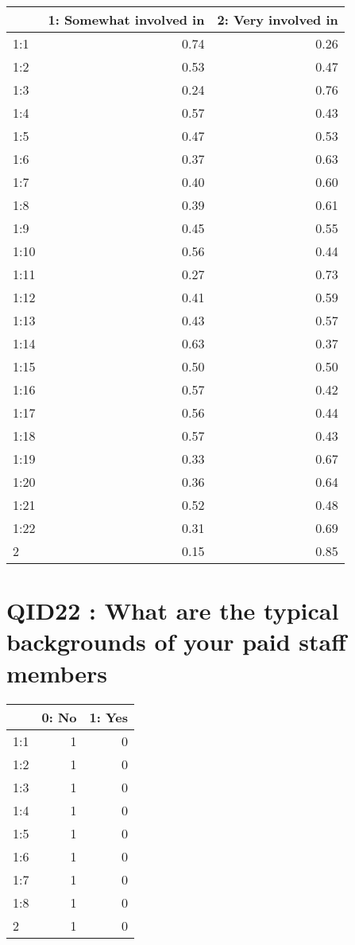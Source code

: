 \documentclass[]{article}
\begin{document}
\begin{table}[H]
\centering\begingroup\fontsize{30}{32}\selectfont

\begin{tabular}{l|r|r}
\hline
  & 1: Somewhat involved in &  2: Very involved in\\
\hline
1:1 & 0.74 & 0.26\\
\hline
1:2 & 0.53 & 0.47\\
\hline
1:3 & 0.24 & 0.76\\
\hline
1:4 & 0.57 & 0.43\\
\hline
1:5 & 0.47 & 0.53\\
\hline
1:6 & 0.37 & 0.63\\
\hline
1:7 & 0.40 & 0.60\\
\hline
1:8 & 0.39 & 0.61\\
\hline
1:9 & 0.45 & 0.55\\
\hline
1:10 & 0.56 & 0.44\\
\hline
1:11 & 0.27 & 0.73\\
\hline
1:12 & 0.41 & 0.59\\
\hline
1:13 & 0.43 & 0.57\\
\hline
1:14 & 0.63 & 0.37\\
\hline
1:15 & 0.50 & 0.50\\
\hline
1:16 & 0.57 & 0.42\\
\hline
1:17 & 0.56 & 0.44\\
\hline
1:18 & 0.57 & 0.43\\
\hline
1:19 & 0.33 & 0.67\\
\hline
1:20 & 0.36 & 0.64\\
\hline
1:21 & 0.52 & 0.48\\
\hline
1:22 & 0.31 & 0.69\\
\hline
2 & 0.15 & 0.85\\
\hline
\end{tabular}
\endgroup{}
\end{table}

\section{QID22 : What are the typical backgrounds of your paid staff
members}\label{qid22-what-are-the-typical-backgrounds-of-your-paid-staff-members}

\begin{table}[H]
\centering\begingroup\fontsize{30}{32}\selectfont

\begin{tabular}{l|r|r}
\hline
  & 0: No &  1: Yes\\
\hline
1:1 & 1 & 0\\
\hline
1:2 & 1 & 0\\
\hline
1:3 & 1 & 0\\
\hline
1:4 & 1 & 0\\
\hline
1:5 & 1 & 0\\
\hline
1:6 & 1 & 0\\
\hline
1:7 & 1 & 0\\
\hline
1:8 & 1 & 0\\
\hline
2 & 1 & 0\\
\hline
\end{tabular}
\endgroup{}
\end{table}
\end{document}
